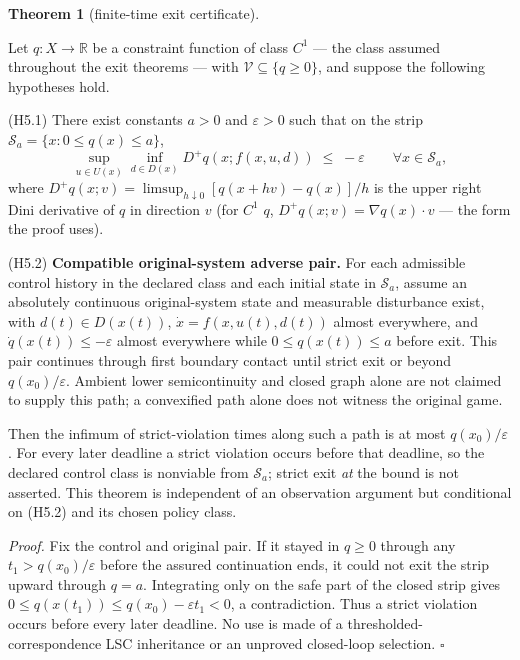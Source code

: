 \documentclass[11pt]{article}
\theoremstyle{definition}
\newtheorem{theorem}{Theorem}
\begin{document}
\begin{theorem}[finite-time exit certificate]\label{thm:exit}

Let \(q : X \to \mathbb{R}\) be a constraint function of class \(C^1\) --- the class assumed throughout the exit theorems --- with
\(\mathcal{V} \subseteq \{ q \ge 0 \}\), and suppose the following
hypotheses hold.

(H5.1) There exist constants \(a > 0\) and \(\varepsilon > 0\) such that
on the strip \(\mathcal{S}_a = \{ x : 0 \le q(x) \le a \}\),
\[\sup_{u \in U(x)} \inf_{d \in D(x)} D^+ q(x; f(x,u,d)) \;\le\; -\varepsilon \qquad \forall x \in \mathcal{S}_a, \tag{4}\]
where \(D^+ q(x; v) = \limsup_{h \downarrow 0} [q(x + hv) - q(x)]/h\) is
the upper right Dini derivative of \(q\) in direction \(v\) (for \(C^1\)
\(q\), \(D^+ q(x; v) = \nabla q(x) \cdot v\) --- the form the proof
uses).

(H5.2) \textbf{Compatible original-system adverse pair.} For each admissible control history in the declared class and each initial state in \(\mathcal S_a\), assume an absolutely continuous original-system state and measurable disturbance exist, with \(d(t)\in D(x(t))\), \(\dot x=f(x,u(t),d(t))\) almost everywhere, and \(\dot q(x(t))\le-\varepsilon\) almost everywhere while \(0\le q(x(t))\le a\) before exit. This pair continues through first boundary contact until strict exit or beyond \(q(x_0)/\varepsilon\). Ambient lower semicontinuity and closed graph alone are not claimed to supply this path; a convexified path alone does not witness the original game.

Then the infimum of strict-violation times along such a path is at most \(q(x_0)/\varepsilon\). For every later deadline a strict violation occurs before that deadline, so the declared control class is nonviable from \(\mathcal S_a\); strict exit \emph{at} the bound is not asserted. This theorem is independent of an observation argument but conditional on (H5.2) and its chosen policy class.
\end{theorem}

\emph{Proof.} Fix the control and original pair. If it stayed in \(q\ge0\) through any \(t_1>q(x_0)/\varepsilon\) before the assured continuation ends, it could not exit the strip upward through \(q=a\). Integrating only on the safe part of the closed strip gives \(0\le q(x(t_1))\le q(x_0)-\varepsilon t_1<0\), a contradiction. Thus a strict violation occurs before every later deadline. No use is made of a thresholded-correspondence LSC inheritance or an unproved closed-loop selection. \ensuremath{\square}
\end{document}
